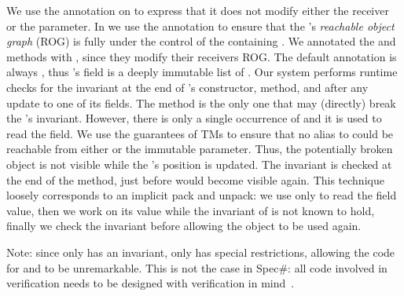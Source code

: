 We use the \Q@read@ annotation on \Q@equals@ to express that it does not modify either the
receiver or the parameter. In \Q@Cage@ we use 
the \Q@capsule@ annotation to ensure
that the \Q@Hamster@'s \emph{reachable object graph} (ROG) is fully under the control
of the containing \Q@Cage@. 
We annotated the \Q@move@
and \Q@moveTo@ methods with \Q@mut@, since they modify
their receivers ROG. The default annotation is always \Q@imm@, thus \Q@Cage@'s \Q@path@ field is a deeply immutable list of \Q@Point@s.
Our system performs runtime checks for the invariant
at the end of \Q@Cage@'s constructor, \Q@moveTo@ method, and after any update to one of its fields.
The \Q@moveTo@ method is the only one that may (directly) break the \Q@Cage@'s invariant. However, there is only a single occurrence of \Q@this@ and it is used to read the \Q@h@ field. We use the guarantees of TMs to ensure that no alias to \Q@this@ could be reachable from either \Q@h@ or the immutable \Q@Point@ parameter. Thus, the potentially broken \Q@this@ object is not visible while the \Q@Hamster@'s position is updated. 
The invariant is checked at the end of the \Q@moveTo@ method, just before \Q@this@ would become visible again.
This technique loosely corresponds to an implicit pack and unpack: we use \Q@this@ only to read the field value, then we work on its value while the invariant of \Q@this@ is not known to hold, finally we check the invariant before allowing the object to  be used again.

Note: since only \Q@Cage@ has an invariant,
 only \Q@Cage@ has special restrictions, allowing the code for \Q@Point@ and \Q@Hamster@ to be unremarkable.
 This is not the case in Spec\#: all code involved in  verification needs to be designed with verification in mind~\cite{barnett2011specification}.

